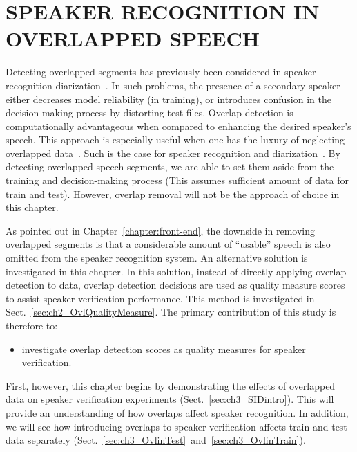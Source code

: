 \chapter{SPEAKER RECOGNITION IN OVERLAPPED SPEECH}
\label{chapter:ovl_in_sid}
Detecting overlapped segments has previously been considered in speaker recognition diarization~\cite{boakye_thesis,yantorno_report}. 
In such problems, the presence of a secondary speaker either decreases model reliability (in training), or introduces confusion in the decision-making process by distorting test files. 
Overlap detection is computationally advantageous when compared to enhancing the desired speaker's speech. 
This approach is especially useful when one has the luxury of neglecting overlapped data~\cite{yantorno_report}. 
Such is the case for speaker recognition and diarization~\cite{Boakye_is_08}. 
By detecting overlapped speech segments, we are able to set them aside from the training and decision-making process (This assumes sufficient amount of data for train and test). 
However, overlap removal will not be the approach of choice in this chapter. 

As pointed out in Chapter~\ref{chapter:front-end}, the downside in removing overlapped segments is that a considerable amount of ``usable'' speech is also omitted from the speaker recognition system. 
An alternative solution is investigated in this chapter. 
In this solution, instead of directly applying overlap detection to data, overlap detection decisions are used as quality measure scores to assist speaker verification performance. 
This method is investigated in Sect.~\ref{sec:ch2_OvlQualityMeasure}. 
The primary contribution of this study is therefore to:
\begin{itemize}
	\item investigate overlap detection scores as quality measures for speaker verification. 
\end{itemize}
First, however, this chapter begins by demonstrating the effects of overlapped data on speaker verification experiments (Sect.~\ref{sec:ch3_SIDintro}). 
This will provide an understanding of how overlaps affect speaker recognition. 
In addition, we will see how introducing overlaps to speaker verification affects train and test data separately (Sect.~\ref{sec:ch3_OvlinTest}~and~\ref{sec:ch3_OvlinTrain}). 


